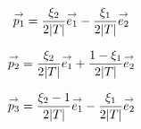     \begin{minipage}{\textwidth}
      \begin{minipage}{0.329\textwidth}
          \begin{center}
            \begin{tikzpicture}[scale=1]
              
            \end{tikzpicture}
          \end{center}
          \begin{equation*}
            \vect{p_1}=\frac{\xi_2}{2|T|}\vect{e_1}-\frac{\xi_1}{2|T|}\vect{e_2}
          \end{equation*}
      \end{minipage}
      \begin{minipage}{0.329\textwidth}
          \begin{center}
            \begin{tikzpicture}[scale=1]
              
            \end{tikzpicture}
             \begin{equation*}
              \vect{p_2}= \frac{\xi_2}{2|T|}\vect{e_1} + \frac{1-\xi_1}{2|T|}\vect{e_2}
            \end{equation*}
          \end{center}
      \end{minipage}
      \begin{minipage}{0.329\textwidth}
          \begin{center}
            \begin{tikzpicture}[scale=1]
              
            \end{tikzpicture}
            \begin{equation*}
              \vect{p_3}= \frac{\xi_2-1}{2|T|}\vect{e_1} - \frac{\xi_1}{2|T|}\vect{e_2}
            \end{equation*}
          \end{center}
      \end{minipage}
      \label{fig:form_int:fon_base:p}
    \end{minipage}

